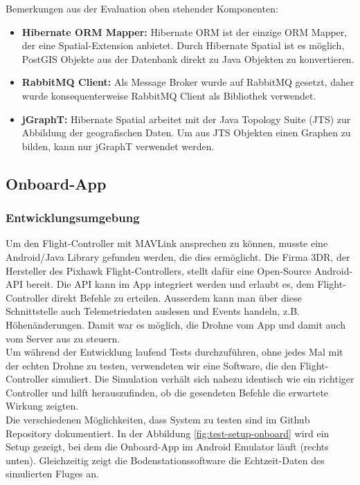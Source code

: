 Bemerkungen aus der Evaluation oben stehender Komponenten:
\begin{itemize}
	\item{\textbf{Hibernate ORM Mapper:} Hibernate ORM ist der einzige ORM Mapper, der eine Spatial-Extension anbietet. Durch Hibernate Spatial ist es möglich, PostGIS Objekte aus der Datenbank direkt zu Java Objekten zu konvertieren.}
	\item{\textbf{RabbitMQ Client:} Als Message Broker wurde auf RabbitMQ gesetzt, daher wurde konsequenterweise RabbitMQ Client als Bibliothek verwendet.}
	\item{\textbf{jGraphT:} Hibernate Spatial arbeitet mit der \Gls{Java Topology Suite} (JTS) zur Abbildung der geografischen Daten. Um aus JTS Objekten einen Graphen zu bilden, kann nur jGraphT verwendet werden.}
\end{itemize}

\subsection{Onboard-App}

\subsubsection{Entwicklungsumgebung}
Um den \Gls{Flight-Controller} mit \Gls{MAVLink} ansprechen zu können, musste eine Android/Java Library gefunden werden, die dies ermöglicht. Die Firma 3DR, der Hersteller des Pixhawk Flight-Controllers, stellt dafür eine Open-Source Android-API bereit. Die API kann im App integriert werden und erlaubt es, dem Flight-Controller direkt Befehle zu erteilen. Ausserdem kann man über diese Schnittstelle auch Telemetriedaten auslesen und Events handeln, z.B. Höhenänderungen. Damit war es möglich, die Drohne vom App und damit auch vom Server aus zu steuern.\\

Um während der Entwicklung laufend Tests durchzuführen, ohne jedes Mal mit der echten Drohne zu testen, verwendeten wir eine Software, die den Flight-Controller simuliert. Die Simulation verhält sich nahezu identisch wie ein richtiger Controller und hilft herauszufinden, ob die gesendeten Befehle die erwartete Wirkung zeigten. \\

Die verschiedenen Möglichkeiten, dass System zu testen sind im Github Repository dokumentiert. In der Abbildung \ref{fig:test-setup-onboard} wird ein Setup gezeigt, bei dem die Onboard-App im Android Emulator läuft (rechts unten). Gleichzeitig zeigt die Bodenstationssoftware die Echtzeit-Daten des simulierten Fluges an.

